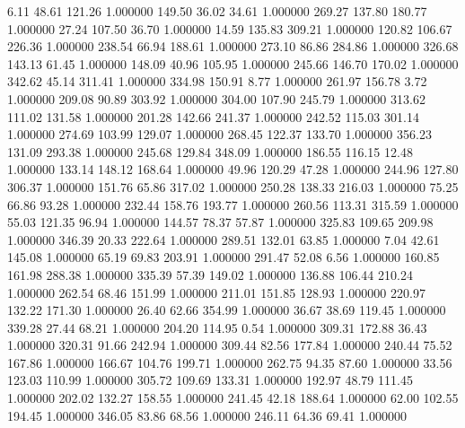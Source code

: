       6.11     48.61    121.26  1.000000
    149.50     36.02     34.61  1.000000
    269.27    137.80    180.77  1.000000
     27.24    107.50     36.70  1.000000
     14.59    135.83    309.21  1.000000
    120.82    106.67    226.36  1.000000
    238.54     66.94    188.61  1.000000
    273.10     86.86    284.86  1.000000
    326.68    143.13     61.45  1.000000
    148.09     40.96    105.95  1.000000
    245.66    146.70    170.02  1.000000
    342.62     45.14    311.41  1.000000
    334.98    150.91      8.77  1.000000
    261.97    156.78      3.72  1.000000
    209.08     90.89    303.92  1.000000
    304.00    107.90    245.79  1.000000
    313.62    111.02    131.58  1.000000
    201.28    142.66    241.37  1.000000
    242.52    115.03    301.14  1.000000
    274.69    103.99    129.07  1.000000
    268.45    122.37    133.70  1.000000
    356.23    131.09    293.38  1.000000
    245.68    129.84    348.09  1.000000
    186.55    116.15     12.48  1.000000
    133.14    148.12    168.64  1.000000
     49.96    120.29     47.28  1.000000
    244.96    127.80    306.37  1.000000
    151.76     65.86    317.02  1.000000
    250.28    138.33    216.03  1.000000
     75.25     66.86     93.28  1.000000
    232.44    158.76    193.77  1.000000
    260.56    113.31    315.59  1.000000
     55.03    121.35     96.94  1.000000
    144.57     78.37     57.87  1.000000
    325.83    109.65    209.98  1.000000
    346.39     20.33    222.64  1.000000
    289.51    132.01     63.85  1.000000
      7.04     42.61    145.08  1.000000
     65.19     69.83    203.91  1.000000
    291.47     52.08      6.56  1.000000
    160.85    161.98    288.38  1.000000
    335.39     57.39    149.02  1.000000
    136.88    106.44    210.24  1.000000
    262.54     68.46    151.99  1.000000
    211.01    151.85    128.93  1.000000
    220.97    132.22    171.30  1.000000
     26.40     62.66    354.99  1.000000
     36.67     38.69    119.45  1.000000
    339.28     27.44     68.21  1.000000
    204.20    114.95      0.54  1.000000
    309.31    172.88     36.43  1.000000
    320.31     91.66    242.94  1.000000
    309.44     82.56    177.84  1.000000
    240.44     75.52    167.86  1.000000
    166.67    104.76    199.71  1.000000
    262.75     94.35     87.60  1.000000
     33.56    123.03    110.99  1.000000
    305.72    109.69    133.31  1.000000
    192.97     48.79    111.45  1.000000
    202.02    132.27    158.55  1.000000
    241.45     42.18    188.64  1.000000
     62.00    102.55    194.45  1.000000
    346.05     83.86     68.56  1.000000
    246.11     64.36     69.41  1.000000
